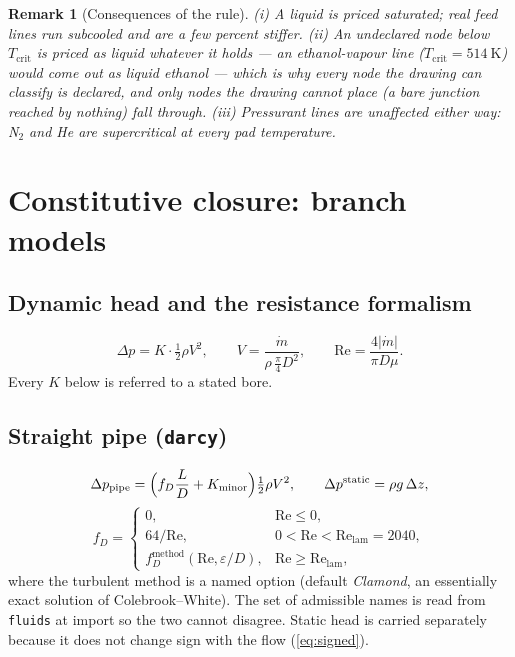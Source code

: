 \documentclass[11pt,a4paper]{article}
\newtheorem{remark}{Remark}
\newcommand{\mdot}{\dot{m}}
\newcommand{\code}[1]{\texttt{#1}}
\begin{document}
\begin{remark}[Consequences of the rule]\label{rem:phase}
(i) A liquid is priced saturated; real feed lines run subcooled and are a few
percent stiffer. (ii) An \emph{undeclared} node below $T_{\mathrm{crit}}$ is
priced as liquid whatever it holds --- an ethanol-vapour line
($T_{\mathrm{crit}}=\SI{514}{\kelvin}$) would come out as liquid ethanol ---
which is why every node the drawing can classify is declared, and only nodes
the drawing cannot place (a bare junction reached by nothing) fall through.
(iii) Pressurant lines are unaffected either way: N$_2$ and He are supercritical
at every pad temperature.
\end{remark}

\section{Constitutive closure: branch models}\label{sec:branches}

\subsection{Dynamic head and the resistance formalism}
\begin{equation}
  \Delta p = K\cdot\tfrac12\rho V^2,\qquad
  V=\frac{\mdot}{\rho\,\frac{\pi}{4}D^2},\qquad
  \mathrm{Re}=\frac{4|\mdot|}{\pi D\mu}.
  \label{eq:head}
\end{equation}
Every $K$ below is referred to a stated bore.

\subsection{Straight pipe (\code{darcy})}
\begin{equation}
  \Delta p_{\mathrm{pipe}} = \Bigl(f_D\frac{L}{D}+K_{\mathrm{minor}}\Bigr)\tfrac12\rho V^2,
  \qquad
  \Delta p^{\mathrm{static}} = \rho g\,\Delta z,
  \label{eq:darcy}
\end{equation}
\begin{equation}
  f_D = \begin{cases}
    0, & \mathrm{Re}\le0,\\
    64/\mathrm{Re}, & 0<\mathrm{Re}<\mathrm{Re}_{\mathrm{lam}}=2040,\\
    f_D^{\text{method}}(\mathrm{Re},\varepsilon/D), & \mathrm{Re}\ge\mathrm{Re}_{\mathrm{lam}},
  \end{cases}
\end{equation}
where the turbulent method is a named option (default \emph{Clamond}, an
essentially exact solution of Colebrook--White). The set of admissible names is
read from \code{fluids} at import so the two cannot disagree. Static head is
carried separately because it does not change sign with the flow
(\cref{eq:signed}).
\end{document}

